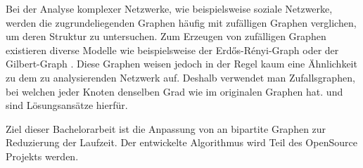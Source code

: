Bei der Analyse komplexer Netzwerke, wie beispielsweise soziale Netzwerke, 
werden die zugrundeliegenden Graphen häufig mit zufälligen Graphen verglichen, 
um deren Struktur zu untersuchen\cite{DBLP:conf/esa/CarstensH0PTW18}.
%
Zum Erzeugen von zufälligen Graphen existieren diverse Modelle wie 
beispielsweise der Erd\H{o}s-R\'enyi-Graph \cite{erdos}
oder der Gilbert-Graph \cite{gilbert}.
Diese Graphen
weisen jedoch in der Regel kaum eine Ähnlichkeit zu dem zu analysierenden Netzwerk auf.
Deshalb verwendet man Zufallsgraphen, 
bei welchen jeder Knoten denselben Grad wie im originalen Graphen hat.
\cb{} \cite{curveball} und \gc{}\cite{DBLP:conf/esa/CarstensH0PTW18} sind Lösungsansätze hierfür.

Ziel dieser Bachelorarbeit ist die Anpassung von \gc{} an bipartite Graphen zur 
Reduzierung der Laufzeit. Der entwickelte Algorithmus wird Teil des OpenSource Projekts \nk{}\cite{nk_page} werden.

